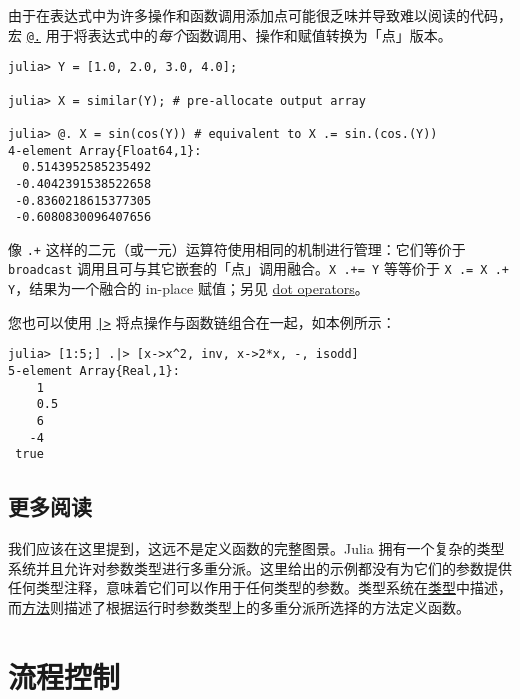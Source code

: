 由于在表达式中为许多操作和函数调用添加点可能很乏味并导致难以阅读的代码，宏 \hyperlink{16688502228717894452}{\texttt{@.}} 用于将表达式中的\emph{每个}函数调用、操作和赋值转换为「点」版本。




\begin{verbatim}
julia> Y = [1.0, 2.0, 3.0, 4.0];

julia> X = similar(Y); # pre-allocate output array

julia> @. X = sin(cos(Y)) # equivalent to X .= sin.(cos.(Y))
4-element Array{Float64,1}:
  0.5143952585235492
 -0.4042391538522658
 -0.8360218615377305
 -0.6080830096407656
\end{verbatim}



像 \texttt{.+} 这样的二元（或一元）运算符使用相同的机制进行管理：它们等价于 \texttt{broadcast} 调用且可与其它嵌套的「点」调用融合。\texttt{X .+= Y} 等等价于 \texttt{X .= X .+ Y}，结果为一个融合的 in-place 赋值；另见 \hyperlink{15967322336376951940}{dot operators}。



您也可以使用 \hyperlink{5135459825603202944}{\texttt{|>}} 将点操作与函数链组合在一起，如本例所示：




\begin{verbatim}
julia> [1:5;] .|> [x->x^2, inv, x->2*x, -, isodd]
5-element Array{Real,1}:
    1
    0.5
    6
   -4
 true
\end{verbatim}



\hypertarget{17965614568943116111}{}


\section{更多阅读}



我们应该在这里提到，这远不是定义函数的完整图景。Julia 拥有一个复杂的类型系统并且允许对参数类型进行多重分派。这里给出的示例都没有为它们的参数提供任何类型注释，意味着它们可以作用于任何类型的参数。类型系统在\hyperlink{8510890508040013186}{类型}中描述，而\hyperlink{3842379394166369470}{方法}则描述了根据运行时参数类型上的多重分派所选择的方法定义函数。



\hypertarget{8001618391799989953}{}


\chapter{流程控制}



